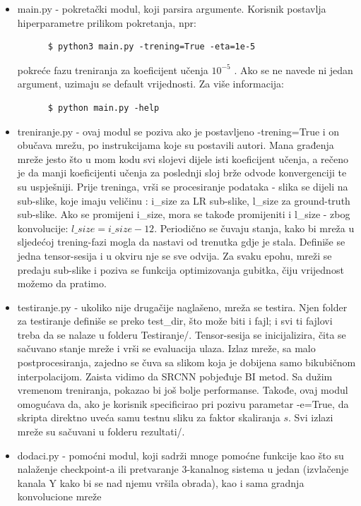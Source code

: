 \documentclass[12pt]{report}
\numberwithin{equation}{section}
\begin{document}
  \begin{itemize}
  
   \item main.py - pokretački modul, koji parsira argumente. Korisnik postavlja hiperparametre prilikom pokretanja, npr: 
   \begin{lstlisting}
      $ python3 main.py -trening=True -eta=1e-5
   \end{lstlisting}
    pokreće fazu treniranja za koeficijent učenja $10^{-5}$ . Ako se ne navede ni jedan argument, uzimaju se default vrijednosti. Za više informacija:
     \begin{lstlisting}
      $ python main.py -help
   \end{lstlisting}
    \item treniranje.py - ovaj modul se poziva ako je postavljeno -trening=True i on obučava mrežu, po instrukcijama koje su postavili autori. Mana građenja mreže jesto što u mom kodu svi slojevi dijele isti koeficijent učenja, a rečeno je da manji koeficijenti učenja za poslednji sloj brže odvode konvergenciji te su uspješniji. Prije treninga, vrši se procesiranje podataka - slika se dijeli na sub-slike, koje imaju veličinu : i\_size za LR sub-slike, l\_size za ground-truth sub-slike. Ako se promijeni i\_size, mora se takođe promijeniti i l\_size - zbog konvolucije: $l\_size=i\_size-12$. Periodično se čuvaju stanja, kako bi mreža u sljedećoj trening-fazi mogla da nastavi od trenutka gdje je stala. Definiše se jedna tensor-sesija i u okviru nje se sve odvija. Za svaku epohu,  mreži se predaju sub-slike i poziva se funkcija optimizovanja gubitka, čiju vrijednost možemo da pratimo. 
    
    \item testiranje.py - ukoliko nije drugačije naglašeno, mreža se testira. Njen folder za testiranje definiše se preko test\_dir, što može biti i fajl; i svi ti fajlovi treba da se nalaze u folderu Testiranje/.  Tensor-sesija se inicijalizira, čita se sačuvano stanje mreže i vrši se evaluacija ulaza. Izlaz mreže, sa malo postprocesiranja, zajedno se čuva sa slikom koja je dobijena samo bikubičnom interpolacijom. Zaista vidimo da SRCNN pobjeđuje BI metod. Sa dužim vremenom treniranja, pokazao bi još bolje performanse.  Takođe, ovaj modul omogućava da, ako je korisnik specificirao pri pozivu parametar -e=True, da skripta direktno uveća samu testnu sliku za faktor skaliranja $s$. Svi izlazi mreže su sačuvani u folderu rezultati/.
    
    \item dodaci.py - pomoćni modul, koji sadrži mnoge pomoćne funkcije kao što su nalaženje checkpoint-a ili pretvaranje 3-kanalnog sistema u jedan (izvlačenje kanala Y kako bi se nad njemu vršila obrada), kao i sama gradnja konvolucione mreže
  \end{itemize}
  
\end{document}
